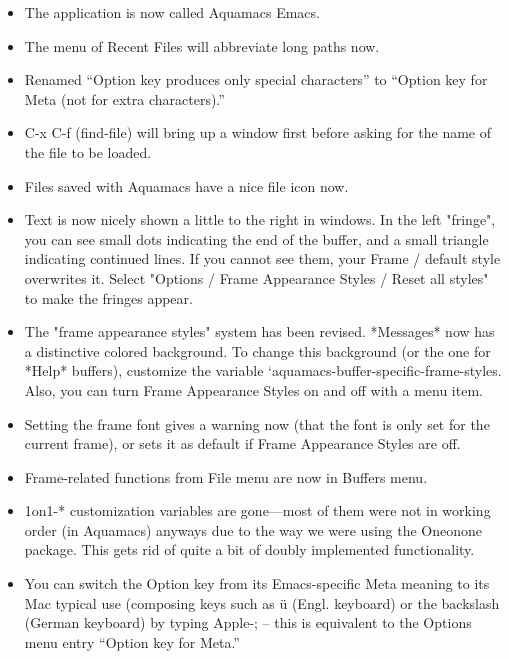 \begin{itemize}
\item The application is now called Aquamacs Emacs.



\item The menu of Recent Files will abbreviate long paths now.

	
\item Renamed ``Option key produces only special characters'' to
  ``Option key for Meta (not for extra characters).''

\item C-x C-f  (find-file) will bring up a window first before asking for the
	name of the file to be loaded.

\item Files saved with Aquamacs have a nice file icon now.

\item Text is now nicely shown a little to the right in windows. In
	the left "fringe", you can see small dots indicating the end of
	the buffer, and a small triangle indicating continued lines. If
	you cannot see them, your Frame / default style overwrites
	it. Select "Options / Frame Appearance Styles / Reset all styles"
	to make the fringes appear.

\item The "frame appearance styles" system has been revised. *Messages* now has
	a distinctive colored background. To change this background (or
	the one for *Help* buffers), customize the variable 
	`aquamacs-buffer-specific-frame-styles. Also, you can turn Frame Appearance Styles on and off with a menu
	item.  

\item Setting the frame font gives a warning now (that the font
	is only set for the current frame), or sets it as default if Frame
	Appearance Styles are off.

\item Frame-related functions from File menu are now in Buffers menu.

\item 1on1-* customization variables are gone---most of them were not in working
	order (in Aquamacs) anyways due to the way we were using the
	Oneonone package. This gets rid of quite a bit of doubly
	implemented functionality.

\item You can switch the Option key from its Emacs-specific
	Meta meaning to its Mac typical use (composing keys such as \"{u}
	 (Engl. keyboard) or the backslash (German keyboard) by typing Apple-; -- this
	is equivalent to the Options menu entry ``Option key for Meta.''


\end{itemize}
